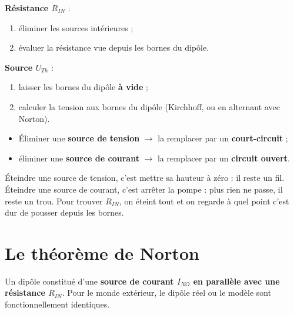 
\begin{thmbox}[title=Méthode de base pour calculer le modèle de Thévenin]
\textbf{Résistance $R_{IN}$} :
\begin{enumerate}
  \item éliminer les sources intérieures ;
  \item évaluer la résistance vue depuis les bornes du dipôle.
\end{enumerate}
\textbf{Source $U_{Th}$} :
\begin{enumerate}
  \item laisser les bornes du dipôle \textbf{à vide} ;
  \item calculer la tension aux bornes du dipôle (Kirchhoff, ou en alternant avec Norton).
\end{enumerate}
\end{thmbox}

\begin{warnbox}[title=Éliminer une source]
\begin{itemize}
  \item Éliminer une \textbf{source de tension} $\to$ la remplacer par un
        \textbf{court-circuit} ;
  \item éliminer une \textbf{source de courant} $\to$ la remplacer par un \textbf{circuit
        ouvert}.
\end{itemize}
\end{warnbox}

\begin{goatbox}
Éteindre une source de tension, c'est mettre sa hauteur à zéro : il reste un fil. Éteindre
une source de courant, c'est arrêter la pompe : plus rien ne passe, il reste un trou. Pour
trouver $R_{IN}$, on éteint tout et on regarde \og à quel point c'est dur de pousser\fg{}
depuis les bornes.
\end{goatbox}

\section{Le théorème de Norton}


\begin{thmbox}[title={Théorème de Norton (Edward, 1926)}]
\og Un dipôle constitué d'une \textbf{source de courant $I_{NO}$ en parallèle avec une
résistance $R_{IN}$}.\fg{} Pour le monde extérieur, le dipôle réel ou le modèle sont
fonctionnellement identiques.
\end{thmbox}

